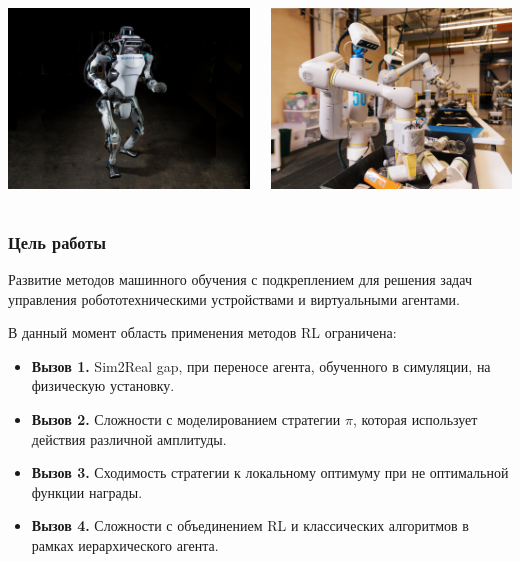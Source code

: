 \begin{frame}
\begin{columns}
\centering
\includegraphics[width=0.8\linewidth]{Presentation/images/boston_dunamics.jpg}

\vspace{10pt}
\centering
\includegraphics[width=0.8\linewidth]{Presentation/images/garbage_sorting.png}

\end{columns} 
\end{frame}

\begin{frame}
    \setlength{\leftmargini}{0cm}
    \frametitle{Цель работы}
     Развитие методов машинного обучения с подкреплением для решения задач управления робототехническими устройствами и виртуальными агентами.

    \vspace{20pt}
    В данный момент область применения методов RL ограничена:
    \begin{itemize}
        \item[] \textbf{Вызов 1.} Sim2Real gap, при переносе агента, обученного в симуляции, на физическую установку.
        \item[] \textbf{Вызов 2.} Сложности с моделированием стратегии $\pi$, которая использует действия различной амплитуды.
        \item[] \textbf{Вызов 3.} Сходимость стратегии к локальному  оптимуму при не оптимальной функции награды.
       \item[] \textbf{Вызов 4.} Сложности с объединением RL и классических алгоритмов в рамках иерархического агента.
    \end{itemize}
\end{frame}

